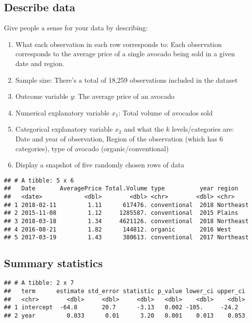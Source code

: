 \documentclass[
]{article}
\providecommand{\tightlist}{%
  \setlength{\itemsep}{0pt}\setlength{\parskip}{0pt}}
\begin{document}
\hypertarget{describe-data}{%
\subsection{Describe data}\label{describe-data}}

Give people a sense for your data by describing:

\begin{enumerate}
\def\labelenumi{\arabic{enumi}.}
\tightlist
\item
  What each observation in each row corresponds to: Each observation
  corresponds to the average price of a single avocado being sold in a
  given date and region.
\item
  Sample size: There's a total of 18,259 observations included in the
  dataset
\item
  Outcome variable \(y\): The average price of an avocado
\item
  Numerical explanatory variable \(x_1\): Total volume of avocados sold
\item
  Categorical explanatory variable \(x_2\) and what the \(k\)
  levels/categories are: Date and year of observation, Region of the
  observation (which has 6 categories), type of avocado
  (organic/conventional)
\item
  Display a snapshot of five randomly chosen rows of data
\end{enumerate}

\begin{verbatim}
## # A tibble: 5 x 6
##   Date       AveragePrice Total.Volume type          year region   
##   <date>            <dbl>        <dbl> <chr>        <dbl> <chr>    
## 1 2018-02-11         1.11      617476. conventional  2018 Northeast
## 2 2015-11-08         1.12     1285587. conventional  2015 Plains   
## 3 2018-03-18         1.34     4621126. conventional  2018 Northeast
## 4 2016-08-21         1.82      144812. organic       2016 West     
## 5 2017-03-19         1.43      380613. conventional  2017 Northeast
\end{verbatim}

\hypertarget{summary-statistics}{%
\subsection{Summary statistics}\label{summary-statistics}}

\begin{verbatim}
## # A tibble: 2 x 7
##   term      estimate std_error statistic p_value lower_ci upper_ci
##   <chr>        <dbl>     <dbl>     <dbl>   <dbl>    <dbl>    <dbl>
## 1 intercept  -64.8       20.7      -3.13   0.002 -105.     -24.2  
## 2 year         0.033      0.01      3.20   0.001    0.013    0.053
\end{verbatim}
\end{document}
